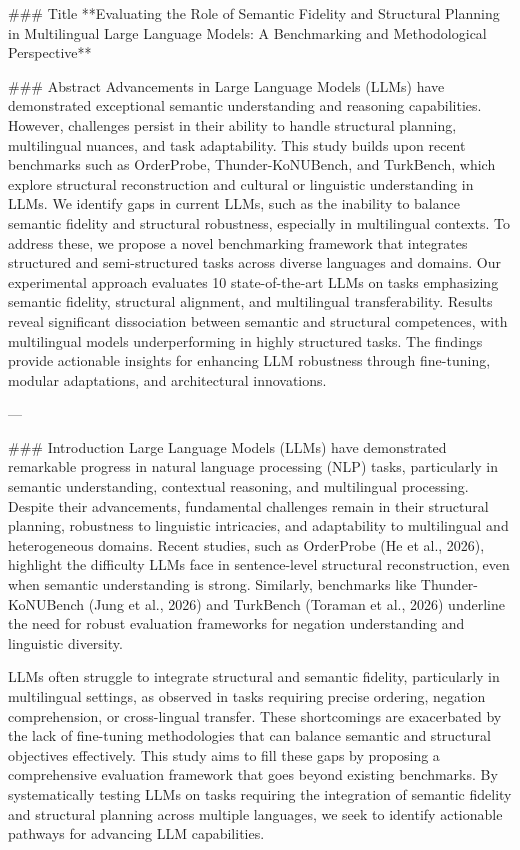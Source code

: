 ### Title
**Evaluating the Role of Semantic Fidelity and Structural Planning in Multilingual Large Language Models: A Benchmarking and Methodological Perspective**

### Abstract
Advancements in Large Language Models (LLMs) have demonstrated exceptional semantic understanding and reasoning capabilities. However, challenges persist in their ability to handle structural planning, multilingual nuances, and task adaptability. This study builds upon recent benchmarks such as OrderProbe, Thunder-KoNUBench, and TurkBench, which explore structural reconstruction and cultural or linguistic understanding in LLMs. We identify gaps in current LLMs, such as the inability to balance semantic fidelity and structural robustness, especially in multilingual contexts. To address these, we propose a novel benchmarking framework that integrates structured and semi-structured tasks across diverse languages and domains. Our experimental approach evaluates 10 state-of-the-art LLMs on tasks emphasizing semantic fidelity, structural alignment, and multilingual transferability. Results reveal significant dissociation between semantic and structural competences, with multilingual models underperforming in highly structured tasks. The findings provide actionable insights for enhancing LLM robustness through fine-tuning, modular adaptations, and architectural innovations.

---

### Introduction
Large Language Models (LLMs) have demonstrated remarkable progress in natural language processing (NLP) tasks, particularly in semantic understanding, contextual reasoning, and multilingual processing. Despite their advancements, fundamental challenges remain in their structural planning, robustness to linguistic intricacies, and adaptability to multilingual and heterogeneous domains. Recent studies, such as OrderProbe (He et al., 2026), highlight the difficulty LLMs face in sentence-level structural reconstruction, even when semantic understanding is strong. Similarly, benchmarks like Thunder-KoNUBench (Jung et al., 2026) and TurkBench (Toraman et al., 2026) underline the need for robust evaluation frameworks for negation understanding and linguistic diversity.

LLMs often struggle to integrate structural and semantic fidelity, particularly in multilingual settings, as observed in tasks requiring precise ordering, negation comprehension, or cross-lingual transfer. These shortcomings are exacerbated by the lack of fine-tuning methodologies that can balance semantic and structural objectives effectively. This study aims to fill these gaps by proposing a comprehensive evaluation framework that goes beyond existing benchmarks. By systematically testing LLMs on tasks requiring the integration of semantic fidelity and structural planning across multiple languages, we seek to identify actionable pathways for advancing LLM capabilities.

